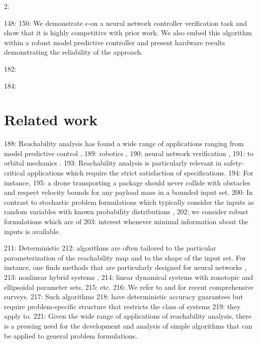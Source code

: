 2: \documentclass[12pt]{l4dc2022} %
\begin{document}
148: \vspace{-1mm}
150: We demonstrate $\epsilon$-\randup on a neural network controller verification task and show that it is highly competitive with prior work. We also embed this algorithm within a robust model predictive controller and present hardware results demonstrating the reliability of the approach. 

182: \vspace{-1mm}

184: \section{Related work}\label{sec:related_work}

188: Reachability analysis has found a wide range of applications ranging from model predictive control \citep{Schurmann2018}, 
189: robotics \citep{Shao2021,LewEtAl2022}, 
190: neural network verification \citep{Tran2019,Hu2020},  
191: to orbital mechanics \citep{Wittig2015}. 
193: Reachability analysis is particularly relevant in safety-critical applications which require the strict satisfaction of specifications. 
194: For instance, 
195: a drone transporting a package should never collide with obstacles and respect velocity bounds for any payload mass in a bounded input set. %
200: In contrast to stochastic problem formulations which typically consider the inputs as random variables with known probability distributions \citep{Webb2019,Sinha2020,DevonportL4DC2020}, 
202: we consider robust formulations which are of %
203: interest whenever minimal information about the inputs is available. 

211: Deterministic %
212: algorithms are often tailored to the particular parameterization of the reachability map and to the shape of the input set. For instance, one finds methods that are particularly designed for neural networks \citep{Tran2019,IvanovVerisig2019,Hu2020}, 
213: nonlinear hybrid systems \citep{Chen2013,Kong2015}, 
214: linear dynamical systems with zonotopic \citep{Girard2005} and ellipsoidal \citep{Kurzhanski2000} parameter sets, 
215: etc.  
216: We refer to \citep{Liu2021} and \citep{Althoff2021} for recent comprehensive surveys. 
217: Such algorithms %
218: have deterministic accuracy guarantees but require problem-specific structure that restricts the class of systems 
219: they apply to. 
221: Given the wide range of applications of reachability analysis, there is a pressing need for the development and analysis of simple algorithms that can be applied to general problem formulations. %
\end{document}
